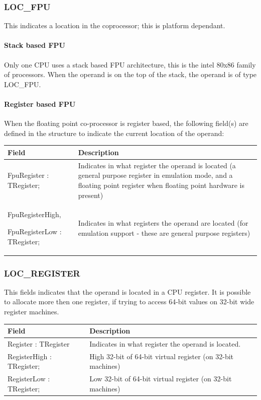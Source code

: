 \documentclass [a4paper,12pt]{article}
\begin{document}
\subsubsection{LOC{\_}FPU}
\label{subsubsec:mylabel19}

This indicates a location in the coprocessor; this is platform dependant.

\paragraph{Stack based FPU}

Only one CPU uses a stack based FPU architecture, this is the intel 80x86
family of processors. When the operand is on the top of the stack, the
operand is of type LOC{\_}FPU.

\paragraph{Register based FPU}

When the floating point co-processor is register based, the following
field(s) are defined in the structure to indicate the current location of
the operand:

\begin{longtable}{|l|p{7cm}|}
\hline
Field   & Description \\
\hline
\endhead
\hline
\endfoot
\textsf{FpuRegister : TRegister;}&
    Indicates in what register the operand is located (a general purpose
    register in emulation mode, and a floating point register when floating
    point hardware is present) \\
\textsf{FpuRegisterHigh, } \par 
\textsf{FpuRegisterLow : TRegister;}&
    Indicates in what registers the operand are located (for emulation
    support - these are general purpose registers)
\end{longtable}

\subsubsection{LOC{\_}REGISTER}
\label{subsubsec:mylabel20}

This fields indicates that the operand is located in a CPU register. It is
possible to allocate more then one register, if trying to access 64-bit
values on 32-bit wide register machines.

\begin{longtable}{|l|p{10cm}|}
\hline
Field   & Description \\
\hline
\endhead
\hline
\endfoot
\textsf{Register : TRegister}&
    Indicates in what register the operand is located. \\
\textsf{RegisterHigh : TRegister;}&
    High 32-bit of 64-bit virtual register (on 32-bit machines) \\
\textsf{RegisterLow : TRegister;}&
    Low 32-bit of 64-bit virtual register (on 32-bit machines)
\end{longtable}
\end{document}
